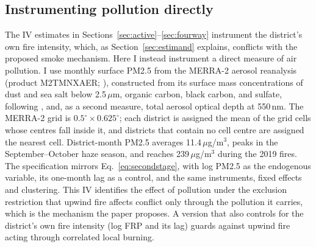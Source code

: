 \documentclass[12pt]{article}
\begin{document}
\subsection{Instrumenting pollution directly}
\label{sec:pollution}

The IV estimates in Sections~\ref{sec:active}--\ref{sec:fourway} instrument the district's own fire intensity, which, as Section~\ref{sec:estimand} explains, conflicts with the proposed smoke mechanism. Here I instead instrument a direct measure of air pollution. I use monthly surface PM2.5 from the MERRA-2 aerosol reanalysis (product M2TMNXAER; \citealp{gelaro2017merra}), constructed from its surface mass concentrations of dust and sea salt below 2.5\,$\mu$m, organic carbon, black carbon, and sulfate, following \citet{buchard2016}, and, as a second measure, total aerosol optical depth at 550\,nm. The MERRA-2 grid is $0.5^{\circ} \times 0.625^{\circ}$; each district is assigned the mean of the grid cells whose centres fall inside it, and districts that contain no cell centre are assigned the nearest cell. District-month PM2.5 averages 11.4\,$\mu$g/m$^3$, peaks in the September--October haze season, and reaches 239\,$\mu$g/m$^3$ during the 2019 fires. The specification mirrors Eq.~\eqref{eq:secondstage}, with log PM2.5 as the endogenous variable, its one-month lag as a control, and the same instruments, fixed effects and clustering. This IV identifies the effect of pollution under the exclusion restriction that upwind fire affects conflict only through the pollution it carries, which is the mechanism the paper proposes. A version that also controls for the district's own fire intensity (log FRP and its lag) guards against upwind fire acting through correlated local burning.
\end{document}
